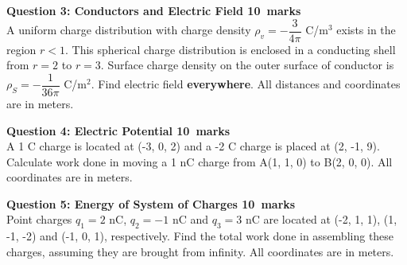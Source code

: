 \documentclass[12pt,a4paper]{article}
\def\Qthree{10}
\def\Qfour{10}
\def\Qfive{10}
\begin{document}
\noindent\textbf{Question 3: Conductors and Electric Field \hfill \Qthree~marks}\\
A uniform charge distribution with charge density $\rho_v=-\dfrac{3}{4\pi}$ C/m$^3$ exists in the region $r<1$. This spherical charge distribution is enclosed in a conducting shell from $r=2$ to $r=3$. Surface charge density on the outer surface of conductor is $\rho_S=-\dfrac{1}{36\pi}$ C/m$^2$. Find electric field \textbf{everywhere}. All distances and coordinates are in meters.
\begin{figure}[H]
\end{figure}

\noindent\textbf{Question 4: Electric Potential \hfill \Qfour~marks}\\
A 1 C charge is located at (-3, 0, 2) and a -2 C charge is placed at (2, -1, 9). Calculate work done in moving a 1 nC charge from A(1, 1, 0) to B(2, 0, 0). All coordinates are in meters.
\begin{figure}[H]
\end{figure}
\noindent\textbf{Question 5: Energy of System of Charges \hfill \Qfive~marks}\\
Point charges $q_1=2$ nC, $q_2=-1$ nC and $q_3=3$ nC are located at (-2, 1, 1), (1, -1, -2) and (-1, 0, 1), respectively. Find the total work done in assembling these charges, assuming they are brought from infinity. All coordinates are in meters.
\begin{figure}[H]
\end{figure}
\end{document}
